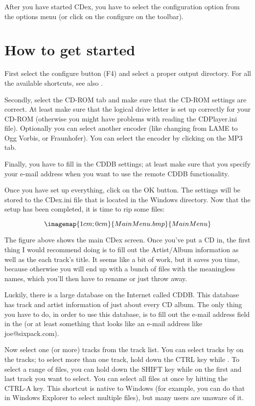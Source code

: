 After you have started CDex, you have to select the configuration option from
the options menu (or click on the configure on the toolbar).


\section{How to get started}

First select the configure button (F4) and select a proper output directory.
For all the available shortcuts, see also .

Secondly, select the CD-ROM tab and make sure that the CD-ROM settings are
correct. At least make sure that the logical drive letter is set up correctly
for your CD-ROM (otherwise you might have problems with reading the
CDPlayer.ini file). Optionally you can select another encoder (like changing
from LAME to Ogg Vorbis, or Fraunhofer). You can select
the encoder by clicking on the MP3 tab.


Finally, you have to fill in the CDDB settings; at least make sure that you
specify your e-mail address when you want to use the remote CDDB functionality.


Once you have set up everything, click on the OK button. The settings will be
stored to the CDex.ini file that is located in the Windows directory. Now that the
setup has been completed, it is time to rip some files:


$$\imagemap{1cm;0cm}{MainMenu.bmp}{MainMenu}$$

The figure above shows the main CDex screen. Once you've put a CD in,
the first thing I would recommend
doing is to fill out the Artist/Album information as well as the each track's
title. It seems like a bit of work, but it saves you time, because otherwise you will end
up with a bunch of files with the meaningless names, which you'll then have to rename or
just throw away.

Luckily, there is a large database on the Internet called CDDB. This database
has track and artist information of just about every CD album. The only thing you
have to do, in order to use this database, is to fill out the e-mail address
field in the  (or at least something that
looks like an e-mail address like joe@sixpack.com).

Now select one (or more) tracks from the track list. You can select tracks by
  on the tracks; to select more than one track,
hold down the CTRL key while . To select a range
of files, you can hold down the SHIFT key while  on
the first and last track you want to select. You can select all files at once by hitting
the CTRL-A  key.  This shortcut is native to
Windows (for example, you can do that in Windows Explorer to select multiple
files), but many users are unaware of it.

